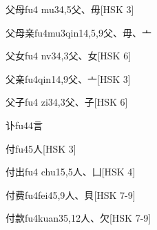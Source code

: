 \begin{EntryWithPhonetic}{父母}{fu4 mu3}{4,5}{⽗、⽏}[HSK 3]
\end{EntryWithPhonetic}

\begin{EntryWithPhonetic}{父母亲}{fu4mu3qin1}{4,5,9}{⽗、⽏、⼇}
\end{EntryWithPhonetic}

\begin{EntryWithPhonetic}{父女}{fu4 nv3}{4,3}{⽗、⼥}[HSK 6]
\end{EntryWithPhonetic}

\begin{EntryWithPhonetic}{父亲}{fu4qin1}{4,9}{⽗、⼇}[HSK 3]
\end{EntryWithPhonetic}

\begin{EntryWithPhonetic}{父子}{fu4 zi3}{4,3}{⽗、⼦}[HSK 6]
\end{EntryWithPhonetic}

\begin{EntryWithPhonetic}{讣}{fu4}{4}{⾔}
\end{EntryWithPhonetic}

\begin{EntryWithPhonetic}{付}{fu4}{5}{⼈}[HSK 3]
\end{EntryWithPhonetic}

\begin{EntryWithPhonetic}{付出}{fu4 chu1}{5,5}{⼈、⼐}[HSK 4]
\end{EntryWithPhonetic}

\begin{EntryWithPhonetic}{付费}{fu4fei4}{5,9}{⼈、⾙}[HSK 7-9]
\end{EntryWithPhonetic}

\begin{EntryWithPhonetic}{付款}{fu4kuan3}{5,12}{⼈、⽋}[HSK 7-9]
\end{EntryWithPhonetic}

